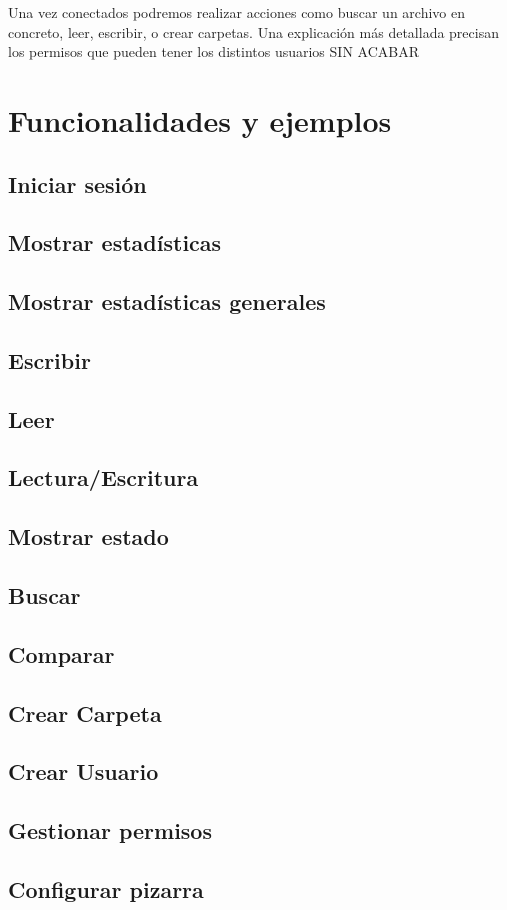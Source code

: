 Una vez conectados podremos realizar acciones como buscar un archivo en concreto, leer, escribir, o crear carpetas. Una explicación más detallada precisan los permisos que pueden tener los distintos usuarios \color{red}SIN ACABAR
\color{black}
\section{Funcionalidades y ejemplos}
\subsection{Iniciar sesión}
\subsection{Mostrar estadísticas}
\subsection{Mostrar estadísticas generales}
\subsection{Escribir}
\subsection{Leer}
\subsection{Lectura/Escritura}
\subsection{Mostrar estado}
\subsection{Buscar}
\subsection{Comparar}
\subsection{Crear Carpeta}
\subsection{Crear Usuario}
\subsection{Gestionar permisos}
\subsection{Configurar pizarra}
